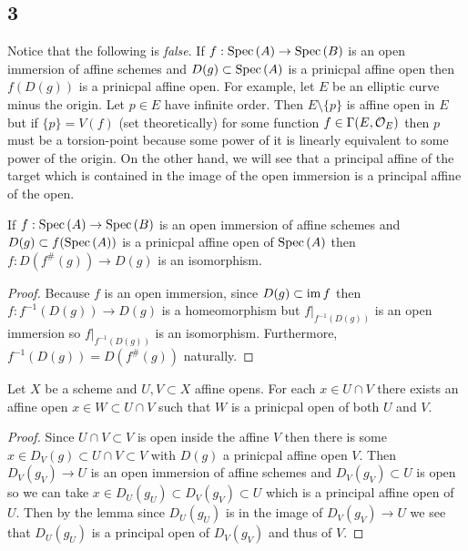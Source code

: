 \documentclass[12pt]{article}
\begin{document}
\renewcommand{\P}{\mathbb{P}}

\subsection{3}


\begin{rmk}
Notice that the following is \textit{false}. If $f : \mathrm{Spec}\left( A \right) \to \mathrm{Spec}\left( B \right)$ is an open immersion of affine schemes and $D(g) \subset \mathrm{Spec}\left( A \right)$ is a prinicpal affine open then $f(D(g))$ is a prinicpal affine open. For example, let $E$ be an elliptic curve minus the origin. Let $p \in E$ have infinite order. Then $E \setminus \{ p \}$ is affine open in $E$ but if $\{ p \} = V(f)$ (set theoretically) for some function $f \in \Gamma(E, \mathcal{O}_{E})$ then $p$ must be a torsion-point because some power of it is linearly equivalent to some power of the origin. On the other hand, we will see that a principal affine of the target which is contained in the image of the open immersion is a principal affine of the open.
\end{rmk}

\begin{lemma}
If $f : \mathrm{Spec}\left( A \right) \to \mathrm{Spec}\left( B \right)$ is an open immersion of affine schemes and $D(g) \subset f(\mathrm{Spec}\left( A \right))$ is a prinicpal affine open of $\mathrm{Spec}\left( A \right)$ then $f : D(f^\#(g)) \to D(g)$ is an isomorphism.
\end{lemma}

\begin{proof}
Because $f$ is an open immersion, since $D(g) \subset \operatorname{\mathrm{im}}{f}$ then $f : f^{-1}(D(g)) \to D(g)$ is a homeomorphism but $f|_{f^{-1}(D(g))}$ is an open immersion so $f|_{f^{-1}(D(g))}$ is an isomorphism. Furthermore, $f^{-1}(D(g)) = D(f^\#(g))$ naturally.
\end{proof}

\begin{cor}[Nike]
Let $X$ be a scheme and $U, V \subset X$ affine opens. For each $x \in U \cap V$ there exists an affine open $x \in W \subset U \cap V$ such that $W$ is a prinicpal open of both $U$ and $V$.
\end{cor}

\begin{proof}
Since $U \cap V \subset V$ is open inside the affine $V$ then there is some $x \in D_V(g) \subset U \cap V \subset V$ with $D(g)$ a prinicpal affine open $V$. Then $D_V(g_V) \to U$ is an open immersion of affine schemes and $D_V(g_V) \subset U$ is open so we can take $x \in D_U(g_U) \subset D_V(g_V) \subset U$ which is a principal affine open of $U$. Then by the lemma since $D_U(g_U)$ is in the image of $D_V(g_V) \to U$ we see that $D_U(g_U)$ is a principal open of $D_V(g_V)$ and thus of $V$.
\end{proof}
\end{document}
